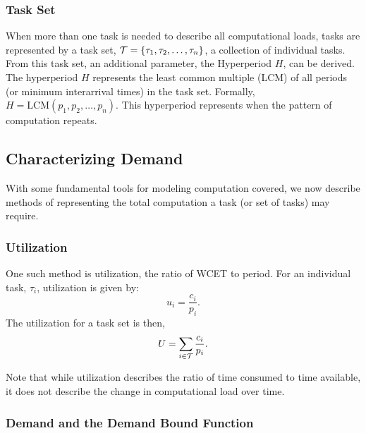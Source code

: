 \subsubsection{Task Set}

When more than one task is needed to describe all computational loads, tasks are represented by a task set, $\mathcal{T} = \{\tau_1, \tau_2, \dots, \tau_n\}$, a collection of individual tasks.
From this task set, an additional parameter, the Hyperperiod $H$, can be derived.
The hyperperiod $H$ represents the least common multiple (LCM) of all periods (or minimum interarrival times) in  the task set.
Formally, $H = \text{LCM}(p_1, p_2, \dots, p_n)$.
This hyperperiod represents when the pattern of computation repeats.

\subsection{Characterizing Demand}

With some fundamental tools for modeling computation covered, we now describe methods of representing the total computation a task (or set of tasks) may require. 

\subsubsection{Utilization}

One such method is utilization, the ratio of WCET to period.
For an individual task, $\tau_i$, utilization is given by:
\begin{equation}
    u_i = \frac{c_i}{p_i}.
\end{equation}
The utilization for a task set is then,
\begin{equation}
    U = \sum_{i \in \mathcal{T}} \frac{c_i}{p_i}.
\end{equation}

Note that while utilization describes the ratio of time consumed to time available, it does not describe the change in computational load over time.

\subsubsection{Demand and the Demand Bound Function}

